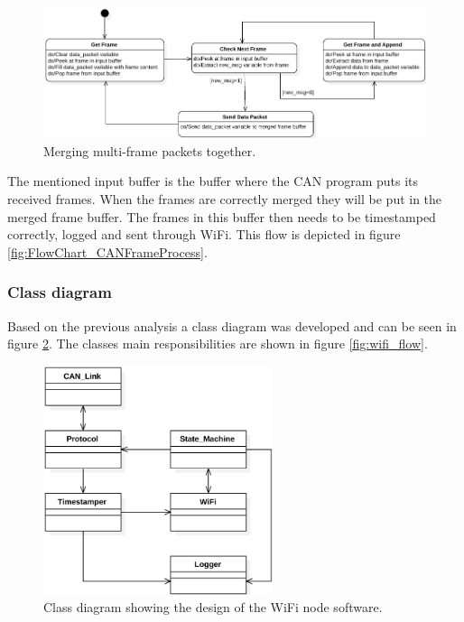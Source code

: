 \begin{figure}[!h]
\centering
\includegraphics[width=1\textwidth]{graphics/StateDiagram_ConcatMsgProcess}
\caption{Merging multi-frame packets together.}
\label{fig:StateDiagram_ConcatMsgProcess}
\end{figure}

The mentioned input buffer is the buffer where the CAN program puts its received frames. 
When the frames are correctly merged they will be put in the merged frame buffer.
The frames in this buffer then needs to be timestamped correctly, logged and sent through WiFi.
This flow is depicted in figure \ref{fig:FlowChart_CANFrameProcess}.


\subsubsection*{Class diagram}
Based on the previous analysis a class diagram was developed and can be seen in figure \ref{fig:StateDiagram_NodeWiFi}.
The classes main responsibilities are shown in figure \ref{fig:wifi_flow}.

\begin{figure}[!h]
\centering
\includegraphics[width=0.6\textwidth]{graphics/ClassDiagram_NodeWiFi}
\caption{Class diagram showing the design of the WiFi node software.}
\label{fig:StateDiagram_NodeWiFi}
\end{figure}

